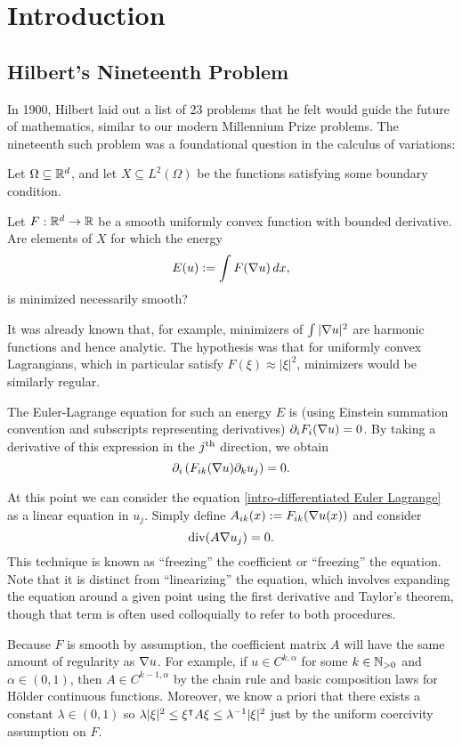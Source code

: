 \chapter{Introduction} \label{ch:intro}

\section{Hilbert's Nineteenth Problem} \label{sec:intro-19}

In 1900, Hilbert laid out a list of 23 problems that he felt would guide the future of mathematics, similar to our modern Millennium Prize problems.  The nineteenth such problem was a foundational question in the calculus of variations: 
\begin{problem}
Let $\Omega \subseteq \mathbb{R}^d$, and let $X \subseteq L^2(\Omega)$ be the functions satisfying some boundary condition.  

Let $F:\mathbb{R}^d \to \mathbb{R}$ be a smooth uniformly convex function with bounded derivative.  Are elements of $X$ for which the energy
\[ E(u) := \int F(\nabla u) \,dx, \]
is minimized necessarily smooth?
\end{problem}
It was already known that, for example, minimizers of $\int |\nabla u|^2$ are harmonic functions and hence analytic.  The hypothesis was that for uniformly convex Lagrangians, which in particular satisfy $F(\xi) \approx |\xi|^2$, minimizers would be similarly regular.  

The Euler-Lagrange equation for such an energy $E$ is (using Einstein summation convention and subscripts representing derivatives) $\partial_i F_i(\nabla u) = 0$.  By taking a derivative of this expression in the $j^\mathrm{th}$ direction,  we obtain
\begin{equation} \label{intro-differentiated Euler Lagrange} \partial_i \left(  F_{ik}(\nabla u) \partial_k u_j \right) = 0. \end{equation}

At this point we can consider the equation \eqref{intro-differentiated Euler Lagrange} as a linear equation in $u_j$.  Simply define $A_{ik}(x) := F_{ik}(\nabla u(x))$ and consider
\[ \operatorname{div}( A \nabla u_j) = 0. \]
This technique is known as ``freezing'' the coefficient or ``freezing'' the equation.  Note that it is distinct from ``linearizing'' the equation, which involves expanding the equation around a given point using the first derivative and Taylor's theorem, though that term is often used colloquially to refer to both procedures.  

Because $F$ is smooth by assumption, the coefficient matrix $A$ will have the same amount of regularity as $\nabla u$.  For example, if $u \in C^{k,\alpha}$ for some $k \in \mathbb{N}_{>0}$ and $\alpha \in (0,1)$, then $A \in C^{k-1,\alpha}$ by the chain rule and basic composition laws for H\"{o}lder continuous functions.  Moreover, we know a priori that there exists a constant $\lambda \in (0,1)$ so $\lambda |\xi|^2 \leq \xi^\intercal A \xi \leq \lambda^{-1} |\xi|^2$ just by the uniform coercivity assumption on $F$.  

